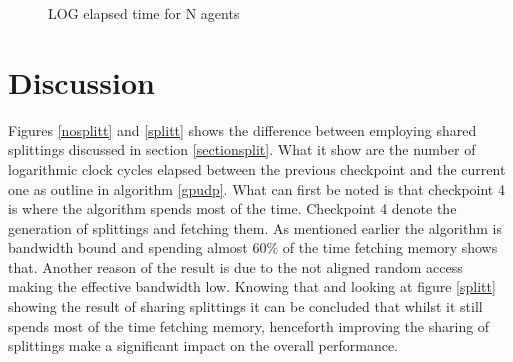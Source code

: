 \documentclass{aamas2012}
\begin{document}
\begin{figure}[width=\linewidth]
\caption{LOG elapsed time for N agents\label{time}}
\end{figure}
\section{Discussion} %
Figures \ref{nosplitt} and \ref{splitt} shows the difference between employing 
shared splittings discussed in section \ref{sectionsplit}. 
What it show are the number of logarithmic clock cycles elapsed between the 
previous checkpoint and the current one as outline in algorithm \ref{gpudp}.
What can first be noted is that checkpoint 4 is where the algorithm spends most of the time. 
Checkpoint 4 denote the generation of splittings and fetching them.
As mentioned earlier the algorithm is bandwidth bound and spending almost
$60\%$ of the time fetching memory shows that. Another reason of the result
is due to the not aligned random access making the effective bandwidth low.
Knowing that and looking at figure \ref{splitt} showing the result of sharing splittings it can be concluded that whilst it still spends most 
of the time fetching memory, henceforth improving the sharing of splittings make a significant impact on the overall performance.
\end{document}
